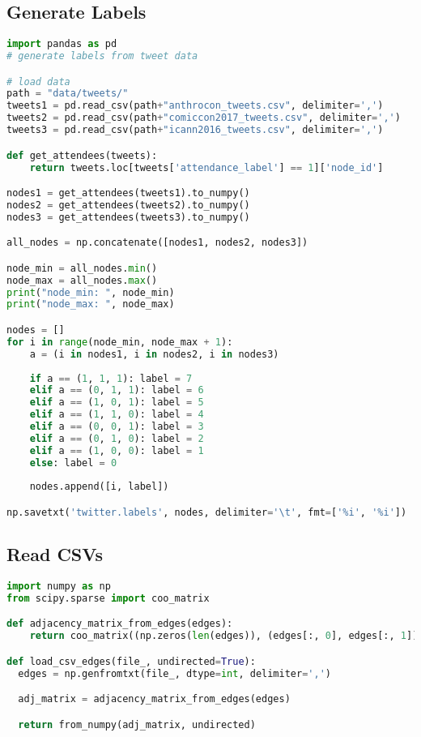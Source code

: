 \documentclass[sigconf]{acmart}
\begin{document}
\subsection{Generate Labels}

\begin{lstlisting}[language=python]
import pandas as pd
# generate labels from tweet data

# load data
path = "data/tweets/"
tweets1 = pd.read_csv(path+"anthrocon_tweets.csv", delimiter=',')
tweets2 = pd.read_csv(path+"comiccon2017_tweets.csv", delimiter=',')
tweets3 = pd.read_csv(path+"icann2016_tweets.csv", delimiter=',')

def get_attendees(tweets):
    return tweets.loc[tweets['attendance_label'] == 1]['node_id']

nodes1 = get_attendees(tweets1).to_numpy()
nodes2 = get_attendees(tweets2).to_numpy()
nodes3 = get_attendees(tweets3).to_numpy()

all_nodes = np.concatenate([nodes1, nodes2, nodes3])

node_min = all_nodes.min()
node_max = all_nodes.max()
print("node_min: ", node_min)
print("node_max: ", node_max)

nodes = []
for i in range(node_min, node_max + 1):
    a = (i in nodes1, i in nodes2, i in nodes3)
    
    if a == (1, 1, 1): label = 7
    elif a == (0, 1, 1): label = 6
    elif a == (1, 0, 1): label = 5
    elif a == (1, 1, 0): label = 4
    elif a == (0, 0, 1): label = 3
    elif a == (0, 1, 0): label = 2
    elif a == (1, 0, 0): label = 1
    else: label = 0
    
    nodes.append([i, label])

np.savetxt('twitter.labels', nodes, delimiter='\t', fmt=['%i', '%i'])
\end{lstlisting}

\subsection{Read CSVs} \label{edge_lists}

\begin{lstlisting}[language=python]
import numpy as np
from scipy.sparse import coo_matrix

def adjacency_matrix_from_edges(edges):
    return coo_matrix((np.zeros(len(edges)), (edges[:, 0], edges[:, 1])))

def load_csv_edges(file_, undirected=True):
  edges = np.genfromtxt(file_, dtype=int, delimiter=',')

  adj_matrix = adjacency_matrix_from_edges(edges)

  return from_numpy(adj_matrix, undirected)
\end{lstlisting}
\end{document}
